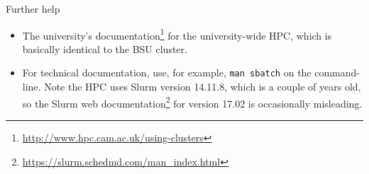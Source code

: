 \documentclass[t,10pt]{beamer}
\let\oldfootnote\footnote
\renewcommand\footnote[1][]{\oldfootnote[frame,#1]}
\begin{document}
\begin{frame}{Further help}

\begin{itemize}
\item The university's documentation\footnote{\url{http://www.hpc.cam.ac.uk/using-clusters}} for the university-wide HPC, which is basically identical to the BSU cluster.

\item For technical documentation, use, for example, \texttt{man sbatch} on the command-line. Note the HPC uses Slurm version 14.11.8, which is a couple of years old, so the Slurm web documentation\footnote{\url{https://slurm.schedmd.com/man_index.html}} for version 17.02 is occasionally misleading.
\end{itemize}

\end{frame}
\end{document}
